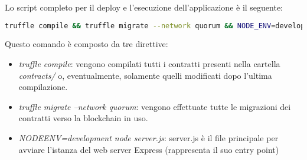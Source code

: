 Lo script completo per il deploy e l'esecuzione dell'applicazione è il seguente:
\newline
\begin{center}
	\begin{lstlisting}[language=sh,caption={Comandi per l'avvio dell'intero ambiente di sviluppo},captionpos=b,frame=lines,basicstyle=\linespread{0.9}\small]
truffle compile && truffle migrate --network quorum && NODE_ENV=development node server.js
	\end{lstlisting}
\end{center}
Questo comando è composto da tre direttive:
\begin{itemize}
	\item \emph{truffle compile}: vengono compilati tutti i contratti presenti nella cartella \emph{contracts/} o, eventualmente, solamente quelli modificati dopo l'ultima compilazione.
	\item \emph{truffle migrate --network quorum}: vengono effettuate tutte le migrazioni dei contratti verso la blockchain in uso.
	\item \emph{NODE\textunderscore ENV=development node server.js}: server.js è il file principale per avviare l'istanza del web server Express (rappresenta il suo entry point)
\end{itemize}
